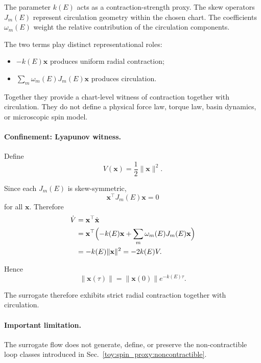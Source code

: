 \documentclass[aps,prx,onecolumn,11pt]{revtex4-2}
\theoremstyle{plain}
\theoremstyle{definition}
\theoremstyle{remark}
\begin{document}
The parameter \(k(E)\) acts as a contraction-strength proxy. The skew
operators \(J_m(E)\) represent circulation geometry within the chosen
chart. The coefficients \(\omega_m(E)\) weight the relative contribution
of the circulation components.

The two terms play distinct representational roles:
\begin{itemize}
\item \(-k(E)\mathbf{x}\) produces uniform radial contraction;
\item \(\sum_m\omega_m(E)J_m(E)\mathbf{x}\) produces circulation.
\end{itemize}

Together they provide a chart-level witness of contraction together
with circulation. They do not define a physical force law, torque law,
basin dynamics, or microscopic spin model.

\paragraph{Confinement: Lyapunov witness.}

Define
\[
V(\mathbf{x})
=
\frac12
\|\mathbf{x}\|^2.
\]

Since each \(J_m(E)\) is skew-symmetric,
\[
\mathbf{x}^\top J_m(E)\mathbf{x}
=
0
\]
for all \(\mathbf{x}\). Therefore
\begin{align}
\dot V
&=
\mathbf{x}^\top\dot{\mathbf{x}}
\nonumber\\
&=
\mathbf{x}^\top
\Bigl(
-k(E)\mathbf{x}
+
\sum_m
\omega_m(E)J_m(E)\mathbf{x}
\Bigr)
\nonumber\\
&=
-k(E)\|\mathbf{x}\|^2
=
-2k(E)V.
\label{eq:toy_basin_lyapunov}
\end{align}

Hence
\begin{equation}
\|\mathbf{x}(\tau)\|
=
\|\mathbf{x}(0)\|
e^{-k(E)\tau}.
\label{eq:toy_basin_norm_decay}
\end{equation}

The surrogate therefore exhibits strict radial contraction together
with circulation.

\paragraph{Important limitation.}

The surrogate flow does not generate, define, or preserve the
non-contractible loop classes introduced in
Sec.~\ref{toy:spin_proxy:noncontractible}.
\end{document}
